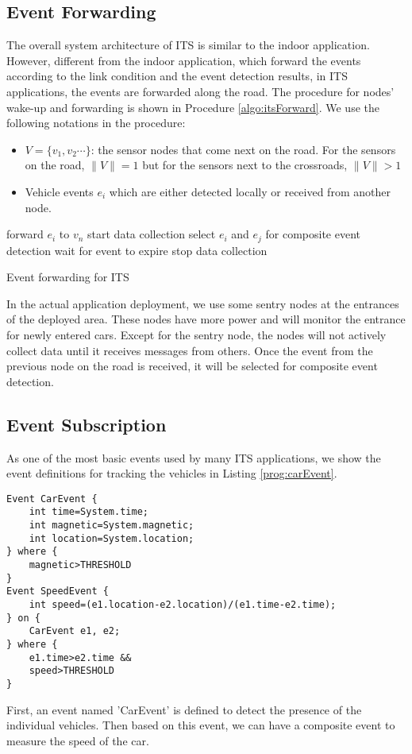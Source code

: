 \subsection{Event Forwarding}
The overall system architecture of ITS is similar to the indoor application. However, different from the indoor application, which forward the events according to the link condition and the event detection results, in ITS applications, the events are forwarded along the road. The procedure for nodes' wake-up and forwarding is shown in Procedure \ref{algo:itsForward}. We use the following notations in the procedure:
\begin{itemize}
\item \(V=\{v_1, v_2 \cdots \}\): the sensor nodes that come next on the road. For the sensors on the road, \(\|V\|=1\) but for the sensors next to the crossroads, \(\|V\|>1\)
\item Vehicle events \(e_i\) which are either detected locally or received from another node.
\end{itemize}

\begin{algorithm}
\begin{algorithmic}
			\STATE forward \(e_i\) to \(v_n\)
		\ENDFOR
	\ENDIF
		\STATE start data collection
			\STATE select \(e_i\) and \(e_j\) for composite event detection
		\ELSE
			\STATE wait for event to expire
		\ENDIF
		\STATE stop data collection
	\ENDIF
\end{algorithmic}
\caption{Event forwarding for ITS}
\label{algo:itsForward}
\end{algorithm}

In the actual application deployment, we use some sentry nodes at the entrances of the deployed area. These nodes have more power and will monitor the entrance for newly entered cars. Except for the sentry node, the nodes will not actively collect data until it receives messages from others. Once the event from the previous node on the road is received, it will be selected for composite event detection.

\subsection{Event Subscription}
As one of the most basic events used by many ITS applications, we show the event definitions for tracking the vehicles in Listing \ref{prog:carEvent}.

\begin{lstlisting}[caption=Event definition for tracking vehicles, label=prog:carEvent]
Event CarEvent {
	int time=System.time;
	int magnetic=System.magnetic;
	int location=System.location;
} where {
	magnetic>THRESHOLD
}
Event SpeedEvent {
	int speed=(e1.location-e2.location)/(e1.time-e2.time);
} on {
	CarEvent e1, e2;
} where {
	e1.time>e2.time &&
	speed>THRESHOLD
}
\end{lstlisting}

First, an event named 'CarEvent' is defined to detect the presence of the individual vehicles. Then based on this event, we can have a composite event to measure the speed of the car.
